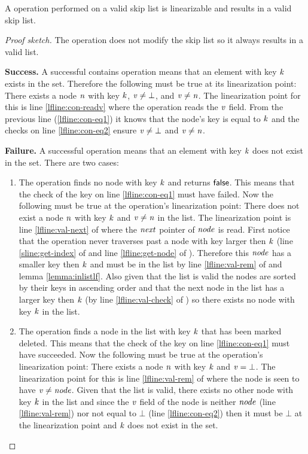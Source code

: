 \begin{lemma}
\label{lemma:contains-linlf}
A  operation performed on a valid skip list is linearizable and results in a valid skip list.
\end{lemma}
\begin{proof}[Proof sketch]
The  operation does not modify the skip list so it always results in a valid list.

{\bf Success.} A successful contains operation means that an element with key $\ms{k}$
exists in the set.
Therefore the following must be true at its linearization point:
There exists a node $\ms{n}$ with key $\ms{k}$, $\ms{v \neq \bot}$, and $\ms{v \neq n}$.
The linearization point for this is line \ref{lfline:con-readv} where the operation reads the $\ms{v}$ field.
From the previous line (\ref{lfline:con-eq1}) it knows that the node's key is equal to $\ms{k}$ and the checks on
line \ref{lfline:con-eq2} ensure $\ms{v \neq \bot}$ and $\ms{v \neq n}$.

{\bf Failure.} A successful  operation means that an element with key $\ms{k}$
does not exist in the set.
There are two cases:
\begin{enumerate} 
  \item The operation finds no node with key $\ms{k}$ and returns $\lit{false}$.
This means that the check of the key on line \ref{lfline:con-eq1} must have failed.
Now the following must be true at the operation's linearization point:
There does not exist a node $\ms{n}$ with key $\ms{k}$ and $\ms{v \neq n}$ in the list.
The linearization point is line \ref{lfline:val-next} of  where the $\ms{next}$ pointer
of $\ms{node}$ is read.
First notice that the operation never traverses past a node with key larger then $\ms{k}$
(line \ref{sline:get-index} of  and line \ref{lfline:get-node} of ).
Therefore this $\ms{node}$ has a smaller key then $\ms{k}$ and must be in the list by line \ref{lfline:val-rem} of  and lemma \ref{lemma:inlistlf}.
Also given that the list is valid the nodes are sorted by their keys in ascending order and that the next node in the list has
a larger key then $\ms{k}$ (by line \ref{lfline:val-check} of ) so there exists
no node with key $\ms{k}$ in the list.
  \item The operation finds a node in the list with key $\ms{k}$ that has been marked deleted.
This means that the check of the key on line \ref{lfline:con-eq1} must have succeeded.
Now the following must be true at the operation's linearization point:
There exists a node $\ms{n}$ with key $\ms{k}$ and $\ms{v = \bot}$.
The linearization point for this is line \ref{lfline:val-rem} of  where the node
is seen to have $\ms{v \neq node}$.
Given that the list is valid, there exists no other node with
key $\ms{k}$ in the list and since the $\ms{v}$ field of the node is neither $\ms{node}$ (line \ref{lfline:val-rem}) nor not equal to  $\bot$ (line \ref{lfline:con-eq2})
then it must be $\bot$ at the linearization point and
$\ms{k}$ does not exist in the set.
\end{enumerate}
\end{proof}


